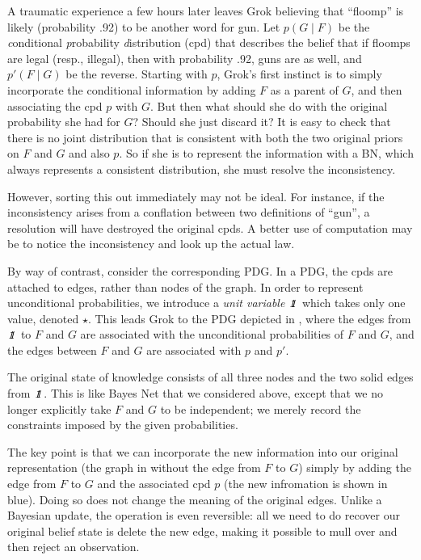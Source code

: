 \documentclass[letterpaper]{article} %
\theoremstyle{plain}
\theoremstyle{definition}
\theoremstyle{remark}
\newcommand{\pdgunit}{\mathrlap{\mathit 1} \mspace{2.3mu}\mathit 1}
\begin{document}
\begin{example}
A traumatic experience a few hours later leaves Grok believing that
``floomp'' is likely (probability .92) to be another word for gun.
Let $p(G \mid F)$ be the \emph conditional \emph probability \emph
distribution (cpd) that describes 
the belief that if floomps are legal (resp., illegal),
then with probability .92, guns are as well, and $p'(F \mid G)$ be
the reverse. 
Starting with $p$, Grok's first instinct is to
simply incorporate the conditional information by adding $F$ as a parent of
$G$, and then associating
the cpd
$p$ with $G$. But then what should she do
with the original probability she had for $G$?  Should she just discard it?
It is easy to check that there is no 
joint distribution
that is consistent with
both
the two original priors on $F$ and $G$ and also 
$p$.  So if she
is to represent the information with a BN, which always represents a consistent
distribution, she must resolve the inconsistency. 





However,
sorting this out immediately may not be ideal.
For instance, if the inconsistency arises from a conflation between
two definitions 
of ``gun'', a resolution will have destroyed the original cpds. A
better use of computation may be to notice the inconsistency and look
up the actual law. 

By way of contrast, consider the corresponding PDG. In a PDG, the cpds are
attached to edges, rather than nodes of the graph.
In order to represent unconditional probabilities, we introduce
a \emph{unit variable} $\pdgunit$ which 
takes only one value, denoted
$\star$. 
This leads Grok to 
the PDG depicted in ,
where the edges from $\pdgunit$ to $F$ and $G$ are associated with the
unconditional probabilities of $F$ and $G$, and the 
edges between $F$ and $G$ are associated with $p$ and $p'$.



The original state of knowledge consists of all three nodes and the two
solid
edges from $\pdgunit$. This is like Bayes Net that we considered above,
except that we 
no longer
explicitly
take  $F$ and $G$ to be independent; we merely record the constraints
imposed by the given probabilities.  
	
The key point is that we can incorporate the new information into our original
representation (the graph in  without the edge from
$F$ to $G$) simply  by adding the edge from $F$ to $G$ and the associated cpd
$p$ (the new infromation is shown in blue).
Doing so does not change the meaning of the original edges.   
Unlike a Bayesian update, the operation is even reversible: all we need
to do recover our original belief state is delete the new edge, 
making it possible to mull over and then reject an observation.
\end{example}
\end{document}
